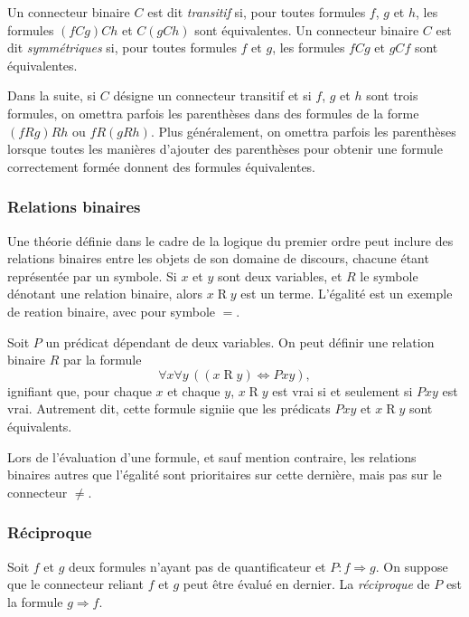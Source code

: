 Un connecteur binaire $C$ est dit \textit{transitif} si, pour toutes formules $f$, $g$ et $h$, les formules $(f C g) C h$ et $C (g C h)$ sont équivalentes.
Un connecteur binaire $C$ est dit \textit{symmétriques} si, pour toutes formules $f$ et $g$, les formules $f C g$ et $g C f$ sont équivalentes.

Dans la suite, si $C$ désigne un connecteur transitif et si $f$, $g$ et $h$ sont trois formules, on omettra parfois les parenthèses dans des formules de la forme $(f R g) R h$ ou $f R (g R h)$. 
Plus généralement, on omettra parfois les parenthèses lorsque toutes les manières d'ajouter des parenthèses pour obtenir une formule correctement formée donnent des formules équivalentes.

\subsubsection{Relations binaires} 

Une théorie définie dans le cadre de la logique du premier ordre peut inclure des relations binaires entre les objets de son domaine de discours, chacune étant représentée par un symbole. 
Si $x$ et $y$ sont deux variables, et $R$ le symbole dénotant une relation binaire, alors $x \mathrel{R} y$ est un terme. 
L'égalité est un exemple de reation binaire, avec pour symbole $=$. 

Soit $P$ un prédicat dépendant de deux variables. 
On peut définir une relation binaire $R$ par la formule 
\begin{equation*}
    \forall x \forall y \, ((x \mathrel{R} y) \Leftrightarrow P x y),
\end{equation*}
ignifiant que, pour chaque $x$ et chaque $y$, $x \mathrel{R} y$ est vrai si et seulement si $P x y$ est vrai. 
Autrement dit, cette formule signiie que les prédicats $P x y$ et $x \mathrel{R} y$ sont équivalents.

Lors de l'évaluation d'une formule, et sauf mention contraire, les relations binaires autres que l'égalité sont prioritaires sur cette dernière, mais pas sur le connecteur $\neq$.

\subsubsection{Réciproque}

Soit $f$ et $g$ deux formules n'ayant pas de quantificateur et $P: f \Rightarrow g$. 
On suppose que le connecteur reliant $f$ et $g$ peut être évalué en dernier.
La \textit{réciproque} de $P$ est la formule $g \Rightarrow f$. 

